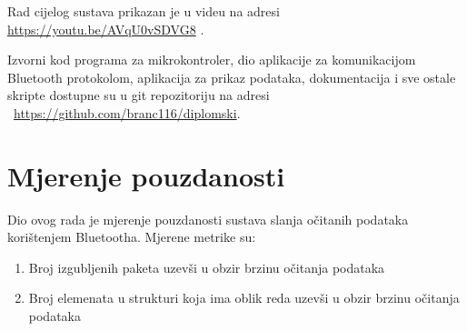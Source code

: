 \documentclass[times, utf8, diplomski]{diplomski}
\begin{document}
Rad cijelog sustava prikazan je u videu na adresi \url{https://youtu.be/AVqU0vSDVG8} \cite{videodemo}.

Izvorni kod programa za mikrokontroler, dio aplikacije za komunikacijom Bluetooth protokolom, aplikacija za prikaz podataka, dokumentacija i sve ostale skripte dostupne su u git repozitoriju na adresi \ \url{https://github.com/branc116/diplomski}.

\newpage
\chapter{Mjerenje pouzdanosti}
Dio ovog rada je mjerenje pouzdanosti sustava slanja očitanih podataka korištenjem Bluetootha. Mjerene metrike su:
\begin{enumerate}
  \item Broj izgubljenih paketa uzevši u obzir brzinu očitanja podataka
  \item Broj elemenata u strukturi koja ima oblik reda uzevši u obzir brzinu očitanja podataka
\end{enumerate}
\end{document}
